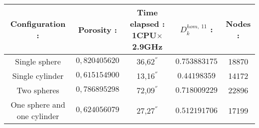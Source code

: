 \begin{center}
\begin{tabular}{|c|c|c|c|c|}
\hline
\rowcolor{gray} Configuration :&Porosity :&Time elapsed : 1CPU$\times$2.9GHz&$D_k^{hom, \ 11}$ :&Nodes :\\
\hline
Single sphere&$0,820405620$&36,62${}^{''}$&$0.753883175$&18870 \\
\hline
Single cylinder&$0,615154900$&13,16${}^{''}$&$0.44198359$&14172 \\
\hline
Two spheres&$0,786895298$&72,09${}^{''}$&$0.718009229$&22896 \\
\hline
One sphere and one cylinder&$0,624056079$&27,27${}^{''}$&$0.512191706$&17199 \\
\hline
\end{tabular}
\end{center}



\begin{comment}
\begin{figure}[H]
%
\begin{center}
%
\end{center}
%
\end{figure}
\end{comment}




























